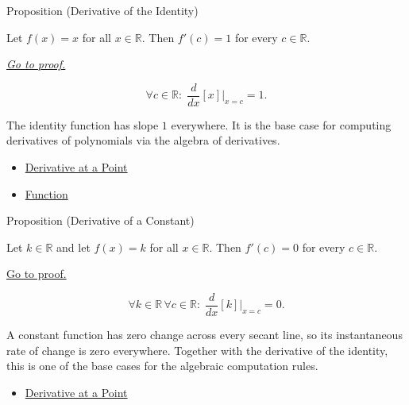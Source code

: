 \begin{propositionbox}{Proposition (Derivative of the Identity)}
\begin{proposition}
\label{prop:derivative-of-the-identity}
Let $f(x) = x$ for all $x \in \mathbb{R}$. Then $f'(c) = 1$ for every $c \in \mathbb{R}$.

\smallskip\noindent
\hyperref[prf:derivative-of-the-identity]{\textit{Go to proof.}}
\end{proposition}
\end{propositionbox}

\begin{remark*}
\[
\forall c \in \mathbb{R}:\; \frac{d}{dx}[x]\big|_{x=c} = 1.
\]
\end{remark*}

\begin{remark*}[Interpretation]
The identity function has slope $1$ everywhere. It is the base case for computing derivatives of polynomials via the algebra of derivatives.
\end{remark*}

\begin{dependencies}
\begin{itemize}
  \item \hyperref[def:derivative-at-a-point]{Derivative at a Point}
  \item \hyperref[def:function]{Function}
\end{itemize}
\end{dependencies}


\begin{propositionbox}{Proposition (Derivative of a Constant)}
\begin{proposition}
\label{prop:derivative-of-a-constant}
Let $k\in\mathbb{R}$ and let $f(x)=k$ for all $x\in\mathbb{R}$. Then $f'(c)=0$ for every $c\in\mathbb{R}$.

\smallskip\noindent
\hyperref[prf:derivative-of-a-constant]{Go to proof.}
\end{proposition}
\end{propositionbox}

\begin{remark*}
\[
  \forall k\in\mathbb{R}\,\forall c\in\mathbb{R}:\;
  \frac{d}{dx}[k]\big|_{x=c}=0.
\]
\end{remark*}

\begin{remark*}[Interpretation]
A constant function has zero change across every secant line, so its instantaneous rate of change is zero everywhere. Together with the derivative of the identity, this is one of the base cases for the algebraic computation rules.
\end{remark*}

\begin{dependencies}
\begin{itemize}
  \item \hyperref[def:derivative-at-a-point]{Derivative at a Point}
\end{itemize}
\end{dependencies}
